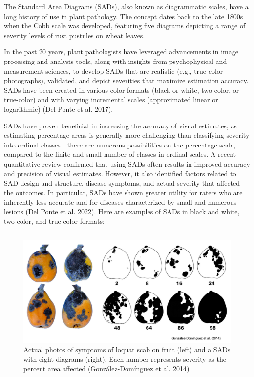 \documentclass[
  letterpaper,
]{book}
\begin{document}
The Standard Area Diagrams (SADs), also known as diagrammatic scales,
have a long history of use in plant pathology. The concept dates back to
the late 1800s when the Cobb scale was developed, featuring five
diagrams depicting a range of severity levels of rust pustules on wheat
leaves.

In the past 20 years, plant pathologists have leveraged advancements in
image processing and analysis tools, along with insights from
psychophysical and measurement sciences, to develop SADs that are
realistic (e.g., true-color photographs), validated, and depict
severities that maximize estimation accuracy. SADs have been created in
various color formats (black or white, two-color, or true-color) and
with varying incremental scales (approximated linear or logarithmic)
(Del Ponte et al. 2017).

SADs have proven beneficial in increasing the accuracy of visual
estimates, as estimating percentage areas is generally more challenging
than classifying severity into ordinal classes - there are numerous
possibilities on the percentage scale, compared to the finite and small
number of classes in ordinal scales. A recent quantitative review
confirmed that using SADs often results in improved accuracy and
precision of visual estimates. However, it also identified factors
related to SAD design and structure, disease symptoms, and actual
severity that affected the outcomes. In particular, SADs have shown
greater utility for raters who are inherently less accurate and for
diseases characterized by small and numerous lesions (Del Ponte et al.
2022). Here are examples of SADs in black and white, two-color, and
true-color formats:

\begin{center}\rule{0.5\linewidth}{0.5pt}\end{center}

\begin{figure}

{\centering \includegraphics[width=6.51042in,height=\textheight]{imgs/sad-loquat.png}

}

\caption{\label{fig-sad-loquat}Actual photos of symptoms of loquat scab
on fruit (left) and a SADs with eight diagrams (right). Each number
represents severity as the percent area affected (González-Domínguez et
al. 2014)}

\end{figure}
\end{document}
